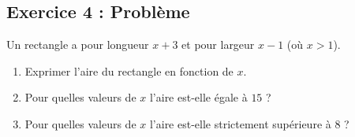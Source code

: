 \documentclass[12pt,a4paper]{article}
\begin{document}
\subsection*{\color{myred} Exercice 4 : Problème}
Un rectangle a pour longueur $x+3$ et pour largeur $x-1$ (où $x > 1$).
\begin{enumerate}[label=\arabic*)]
    \item Exprimer l'aire du rectangle en fonction de $x$.
    \item Pour quelles valeurs de $x$ l'aire est-elle égale à $15$ ?
    \item Pour quelles valeurs de $x$ l'aire est-elle strictement supérieure à $8$ ?
\end{enumerate}
\end{document}

